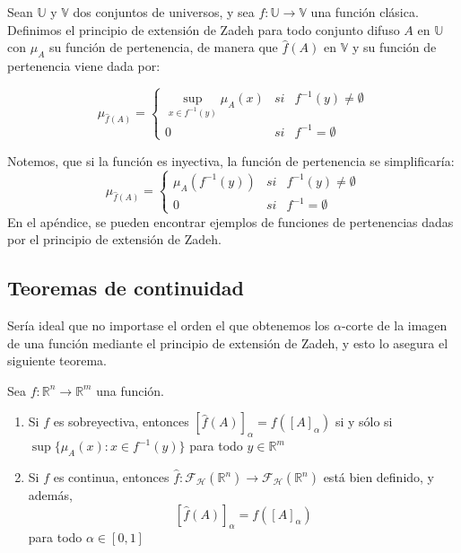 \begin{definicion}
	Sean $\mathbb{U}$ y $\mathbb{V}$ dos conjuntos de universos, y sea $f: \mathbb{U} \longrightarrow \mathbb{V}$ una función clásica. Definimos el principio de extensión de Zadeh para todo conjunto difuso $A$ en $\mathbb{U}$ con $\mu_A$ su función de pertenencia, de manera que $\hat{f}(A)$ en $\mathbb{V}$ y su función de pertenencia viene dada por:
	
	$$
		\mu_{\hat{f}(A)}=\left\{
			\begin{array}{ccc}
				\sup_{x\in f^{-1}(y)} \mu_A(x) & si & f^{-1}(y)\neq\emptyset\\
				0 & si & f^{-1}=\emptyset
			\end{array}
		\right.
	$$
\end{definicion}


Notemos, que si la función es inyectiva, la función de pertenencia se simplificaría:
$$
	\mu_{\hat{f}(A)}=\left\{
		\begin{array}{ccc}
			\mu_A(f^{-1}(y)) & si & f^{-1}(y)\neq\emptyset\\
			0 & si & f^{-1}=\emptyset
		\end{array}
	\right.
$$
En el apéndice, se pueden encontrar ejemplos de funciones de pertenencias dadas por el principio de extensión de Zadeh.

\subsection{Teoremas de continuidad}
Sería ideal que no importase el orden el que obtenemos los $\alpha$-corte de la imagen de una función mediante el principio de extensión de Zadeh, y esto lo asegura el siguiente teorema.

\begin{teorema}
	Sea $f : \mathbb{R}^n \longrightarrow \mathbb{R}^m$ una función.
	\begin{enumerate}
		\item Si $f$ es sobreyectiva, entonces $[\hat{f}(A)]_\alpha = f([A]_\alpha)$ si y sólo si $\sup\{\mu_A(x) : x \in f^{-1}(y)\}$ para todo $y \in \mathbb{R}^m$
		\item Si $f$ es continua, entonces $\hat{f} : \mathcal{F}_\mathcal{H}(\mathbb{R}^n) \longrightarrow \mathcal{F}_\mathcal{H}(\mathbb{R}^n)$ está bien definido, y además,  
		$$[\hat{f}(A)]_\alpha = f([A]_\alpha)$$
		para todo $\alpha \in [0, 1]$
	\end{enumerate}
\end{teorema}

